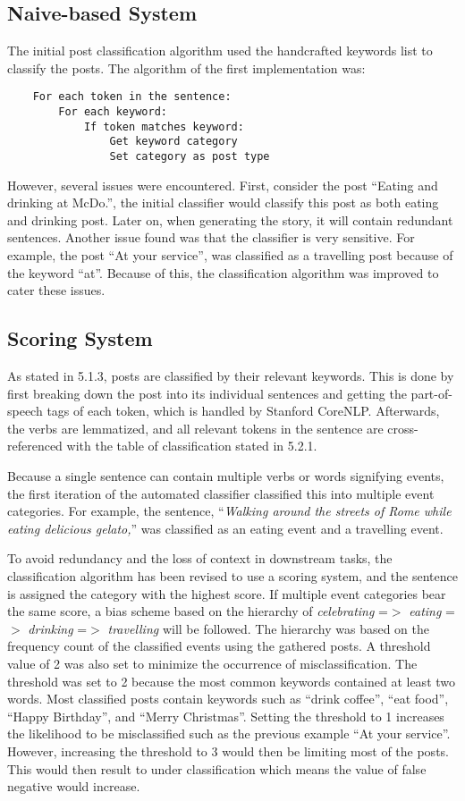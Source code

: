 \subsection{Naive-based System}
The initial post classification algorithm used the handcrafted keywords list to classify the posts. The algorithm of the first implementation was:
\begin{lstlisting}
	For each token in the sentence:
		For each keyword:
			If token matches keyword:
				Get keyword category
				Set category as post type
\end{lstlisting}

However, several issues were encountered. First, consider the post ``Eating and drinking at McDo.”, the initial classifier would classify this post as both eating and drinking post. Later on, when generating the story, it will contain redundant sentences. Another issue found was that the classifier is very sensitive. For example, the post ``At your service”, was classified as a travelling post because of the keyword “at”. Because of this, the classification algorithm was improved to cater these issues.

\subsection{Scoring System}
As stated in 5.1.3, posts are classified by their relevant keywords. This is done by first breaking down the post into its individual sentences and getting the part-of-speech tags of each token, which is handled by Stanford CoreNLP. Afterwards, the verbs are lemmatized, and all relevant tokens in the sentence are cross-referenced with the table of classification stated in 5.2.1.

Because a single sentence can contain multiple verbs or words signifying events, the first iteration of the automated classifier classified this into multiple event categories. For example, the sentence, ``\textit{Walking around the streets of Rome while eating delicious gelato,}” was classified as an eating event and a travelling event. 

To avoid redundancy and the loss of context in downstream tasks, the classification algorithm has been revised to use a scoring system, and the sentence is assigned the category with the highest score. If multiple event categories bear the same score, a bias scheme based on the hierarchy of \textit{celebrating} =$>$ \textit{eating} =$>$ \textit{drinking} =$>$ \textit{travelling} will be followed. The hierarchy was based on the frequency count of the classified events using the gathered posts. A threshold value of 2 was also set to minimize the occurrence of misclassification. The threshold was set to 2 because the most common keywords contained at least two words. Most classified posts contain keywords such as ``drink coffee”, ``eat food”, ``Happy Birthday”, and ``Merry Christmas”. Setting the threshold to 1 increases the likelihood to be misclassified such as the previous example ``At your service”. However, increasing the threshold to 3 would then be limiting most of the posts. This would then result to under classification which means the value of false negative would increase.


